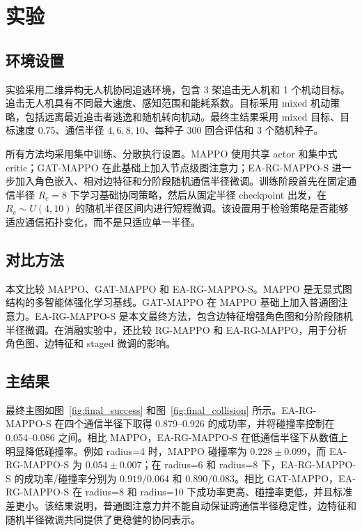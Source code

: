 \section{实验}

\subsection{环境设置}

实验采用二维异构无人机协同追逃环境，包含 3 架追击无人机和 1 个机动目标。追击无人机具有不同最大速度、感知范围和能耗系数。目标采用 mixed 机动策略，包括远离最近追击者逃逸和随机转向机动。最终主结果采用 mixed 目标、目标速度 0.75、通信半径 $4,6,8,10$、每种子 300 回合评估和 3 个随机种子。



所有方法均采用集中训练、分散执行设置。MAPPO 使用共享 actor 和集中式 critic；GAT-MAPPO 在此基础上加入节点级图注意力；EA-RG-MAPPO-S 进一步加入角色嵌入、相对边特征和分阶段随机通信半径微调。训练阶段首先在固定通信半径 $R_c=8$ 下学习基础协同策略，然后从固定半径 checkpoint 出发，在 $R_c\sim U(4,10)$ 的随机半径区间内进行短程微调。该设置用于检验策略是否能够适应通信拓扑变化，而不是只适应单一半径。

\subsection{对比方法}

本文比较 MAPPO、GAT-MAPPO 和 EA-RG-MAPPO-S。MAPPO 是无显式图结构的多智能体强化学习基线。GAT-MAPPO 在 MAPPO 基础上加入普通图注意力。EA-RG-MAPPO-S 是本文最终方法，包含边特征增强角色图和分阶段随机半径微调。在消融实验中，还比较 RG-MAPPO 和 EA-RG-MAPPO，用于分析角色图、边特征和 staged 微调的影响。

\subsection{主结果}



最终主图如图~\ref{fig:final_success} 和图~\ref{fig:final_collision} 所示。EA-RG-MAPPO-S 在四个通信半径下取得 0.879--0.926 的成功率，并将碰撞率控制在 0.054--0.086 之间。相比 MAPPO，EA-RG-MAPPO-S 在低通信半径下从数值上明显降低碰撞率。例如 radius=4 时，MAPPO 碰撞率为 $0.228\pm0.099$，而 EA-RG-MAPPO-S 为 $0.054\pm0.007$；在 radius=6 和 radius=8 下，EA-RG-MAPPO-S 的成功率/碰撞率分别为 $0.919/0.064$ 和 $0.890/0.083$。相比 GAT-MAPPO，EA-RG-MAPPO-S 在 radius=8 和 radius=10 下成功率更高、碰撞率更低，并且标准差更小。该结果说明，普通图注意力并不能自动保证跨通信半径稳定性，边特征和随机半径微调共同提供了更稳健的协同表示。

